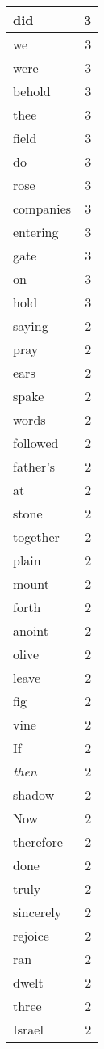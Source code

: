 \begin{center}
\begin{longtable}{l|r}
did & 3\\ \hline 
we & 3\\ \hline 
were & 3\\ \hline 
behold & 3\\ \hline 
thee & 3\\ \hline 
field & 3\\ \hline 
do & 3\\ \hline 
rose & 3\\ \hline 
companies & 3\\ \hline 
entering & 3\\ \hline 
gate & 3\\ \hline 
on & 3\\ \hline 
hold & 3\\ \hline 
saying & 2\\ \hline 
pray & 2\\ \hline 
ears & 2\\ \hline 
spake & 2\\ \hline 
words & 2\\ \hline 
followed & 2\\ \hline 
father's & 2\\ \hline 
at & 2\\ \hline 
stone & 2\\ \hline 
together & 2\\ \hline 
plain & 2\\ \hline 
mount & 2\\ \hline 
forth & 2\\ \hline 
anoint & 2\\ \hline 
olive & 2\\ \hline 
leave & 2\\ \hline 
fig & 2\\ \hline 
vine & 2\\ \hline 
If & 2\\ \hline 
\emph{then} & 2\\ \hline 
shadow & 2\\ \hline 
Now & 2\\ \hline 
therefore & 2\\ \hline 
done & 2\\ \hline 
truly & 2\\ \hline 
sincerely & 2\\ \hline 
rejoice & 2\\ \hline 
ran & 2\\ \hline 
dwelt & 2\\ \hline 
three & 2\\ \hline 
Israel & 2\\ \hline 

\end{longtable}
\end{center}
